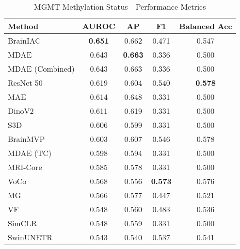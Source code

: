 \begin{table}[ht]
\centering
\caption{MGMT Methylation Status - Performance Metrics}
\label{tab:rsna_miccai_mgmt_methylation}
\begin{tabular}{lcccc}
\toprule
Method & AUROC & AP & F1 & Balanced Acc \\
\midrule
BrainIAC & \textbf{0.651} & 0.662 & 0.471 & 0.547 \\
MDAE & 0.643 & \textbf{0.663} & 0.336 & 0.500 \\
MDAE (Combined) & 0.643 & 0.663 & 0.336 & 0.500 \\
ResNet-50 & 0.619 & 0.604 & 0.540 & \textbf{0.578} \\
MAE & 0.614 & 0.648 & 0.331 & 0.500 \\
DinoV2 & 0.611 & 0.619 & 0.331 & 0.500 \\
S3D & 0.606 & 0.599 & 0.331 & 0.500 \\
BrainMVP & 0.603 & 0.607 & 0.546 & 0.578 \\
MDAE (TC) & 0.598 & 0.594 & 0.331 & 0.500 \\
MRI-Core & 0.585 & 0.578 & 0.331 & 0.500 \\
VoCo & 0.568 & 0.556 & \textbf{0.573} & 0.576 \\
MG & 0.566 & 0.577 & 0.447 & 0.521 \\
VF & 0.548 & 0.560 & 0.483 & 0.536 \\
SimCLR & 0.548 & 0.559 & 0.331 & 0.500 \\
SwinUNETR & 0.543 & 0.540 & 0.537 & 0.541 \\
\bottomrule
\end{tabular}
\end{table}
